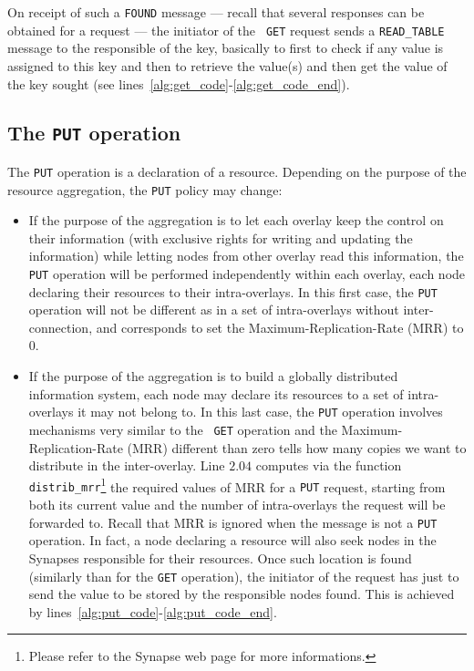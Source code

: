 
On receipt of such a {\tt FOUND} message --- recall that several
responses can be obtained for a request --- the initiator of the {\tt
  GET} request sends a {\tt READ\_TABLE} message to the responsible of
the key, basically to first to check if any value is assigned to this
key and then to retrieve the value(s) and then get the value of the
key sought (see lines~\ref{alg:get_code}-\ref{alg:get_code_end}).

\subsection{The \texttt{PUT} operation}
%
The {\tt PUT} operation is a declaration of a resource. Depending on
the purpose of the resource aggregation, the {\tt PUT} policy may
change:

\begin{itemize}
\item If the purpose of the aggregation is to let each overlay keep
  the control on their information (with exclusive rights for writing
  and updating the information) while letting nodes from other overlay
  read this information, the {\tt PUT} operation will be performed
  independently within each overlay, each node declaring their
  resources to their intra-overlays. In this first case, the {\tt PUT}
  operation will not be different as in a set of intra-overlays
  without inter-connection, and corresponds to set the
  Maximum-Replication-Rate (MRR) to 0.

\item If the purpose of the aggregation is to build a globally
  distributed information system, each node may declare its resources
  to a set of intra-overlays it may not belong to. In this last case,
  the {\tt PUT} operation involves mechanisms very similar to the {\tt
    GET} operation and the Maximum-Replication-Rate (MRR) different
  than zero tells how many copies we want to distribute in the
  inter-overlay. Line $2.04$ computes via the function {\tt
    distrib\_mrr}\footnote{Please refer to the Synapse web page for
    more informations.} the required values of MRR for a {\tt PUT}
  request, starting from both its current value and the number of
  intra-overlays the request will be forwarded to. Recall that MRR is
  ignored when the message is not a {\tt PUT} operation. In fact, a
  node declaring a resource will also seek nodes in the Synapses
  responsible for their resources. Once such location is found
  (similarly than for the {\tt GET} operation), the initiator of the
  request has just to send the value to be stored by the responsible
  nodes found. This is achieved by
  lines~\ref{alg:put_code}-\ref{alg:put_code_end}.

\end{itemize}

